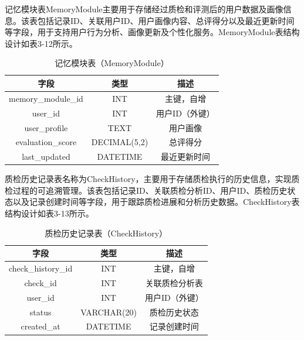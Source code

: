 记忆模块表MemoryModule主要用于存储经过质检和评测后的用户数据及画像信息。该表包括记录ID、关联用户ID、用户画像内容、总评得分以及最近更新时间等字段，用于支持用户行为分析、画像更新及个性化服务。MemoryModule表结构设计如表3-12所示。
\begin{table}[h!]
\centering
\caption{记忆模块表（MemoryModule）}
\begin{tabular}{|c|c|c|}
\hline
字段              & 类型         & 描述                    \\
\hline
memory\_module\_id                & INT          & 主键，自增              \\
user\_id          & INT          & 用户ID（外键）          \\
user\_profile     & TEXT         & 用户画像                \\
evaluation\_score & DECIMAL(5,2) & 总评得分                \\
last\_updated     & DATETIME     & 最近更新时间            \\
\hline
\end{tabular}
\end{table}

质检历史记录表名称为CheckHistory，主要用于存储质检执行的历史信息，实现质检过程的可追溯管理。该表包括记录ID、关联质检分析ID、用户ID、质检历史状态以及记录创建时间等字段，用于跟踪质检进展和分析历史数据。CheckHistory表结构设计如表3-13所示。
\begin{table}[h!]
\centering
\caption{质检历史记录表（CheckHistory）}
\begin{tabular}{|c|c|c|}
\hline
字段              & 类型         & 描述                    \\
\hline
check\_history\_id                & INT          & 主键，自增              \\
check\_id         & INT          & 关联质检分析表          \\
user\_id          & INT          & 用户ID（外键）          \\
status            & VARCHAR(20)  & 质检历史状态            \\
created\_at       & DATETIME     & 记录创建时间            \\
\hline
\end{tabular}
\end{table}

